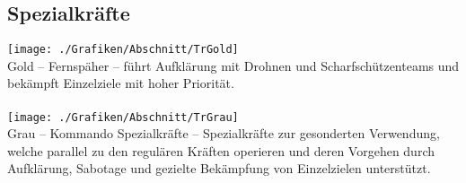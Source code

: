 \subsection{Spezialkräfte}
\texttt{[image: ./Grafiken/Abschnitt/TrGold]}\\
Gold -- Fernspäher -- führt Aufklärung mit Drohnen und Scharfschützenteams und bekämpft Einzelziele mit hoher Priorität.\\\\
\texttt{[image: ./Grafiken/Abschnitt/TrGrau]}\\
Grau -- Kommando Spezialkräfte -- Spezialkräfte zur gesonderten Verwendung, welche parallel zu den regulären Kräften operieren und deren Vorgehen durch Aufklärung, Sabotage und gezielte Bekämpfung von Einzelzielen unterstützt.

